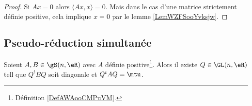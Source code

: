 \begin{proof}
    Si \( Ax=0\) alors \( \langle Ax, x\rangle =0\). Mais dans le cas d'une matrice strictement définie positive, cela implique \( x=0\) par le lemme \ref{LemWZFSooYvksjw}.
\end{proof}

\subsection{Pseudo-réduction simultanée}

\begin{corollary}  \label{CorNHKnLVA}
    Soient \( A,B\in \gS(n,\eR)\) avec \( A\) définie positive\footnote{Définition \ref{DefAWAooCMPuVM}.}. Alors il existe \( Q\in \GL(n,\eR)\) tell que \( Q^tBQ\) soit diagonale et \( Q^tAQ=\mtu\).
\end{corollary}

